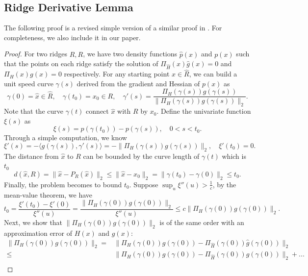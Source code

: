 \documentclass[aos,preprint]{imsart}
\theoremstyle{remark}
\begin{document}
\begin{appendix}
\section{}
\subsection{Ridge Derivative Lemma}
The following proof is a revised simple version of a similar proof in \cite{genovese2014nonparametric}. For completeness, we also include it in our paper.
\begin{proof}\label{Ridge Derivative Lemma}
 For two ridges $\hat{R}, R$, we have two density functions $\hat{p}(x)$ and $p(x)$ such that the points on each ridge satisfy the solution of
 $\Pi_{\hat{H}}(x) \hat{g}(x) = 0$ 
 and $\Pi_H(x) g(x) = 0$ respectively. For any starting point $\hat{x}\in \hat{R}$, we can build a unit speed curve $\gamma(s)$ derived from the gradient and Hessian of $p(x)$ as
 \[
 \gamma(0) = \hat{x} \in \hat{R}, \quad \gamma(t_0) = x_0 \in R, \quad \gamma'(s) = \frac{\Pi_H(\gamma(s))g(\gamma(s))}{\|\Pi_H(\gamma(s))g(\gamma(s))\|_2}.
 \]
Note that the curve $\gamma(t)$ connect $\hat{x}$ with $R$ by $x_0$. Define the univariate function $\xi(s)$ as
  \[
  \xi(s) = p(\gamma(t_0))-p(\gamma(s)), \quad 0<s<t_0.
  \]
Through a simple computation, we know 
 \[
 \xi'(s)=-\langle  g(\gamma(s)), \gamma'(s) \rangle =- \|\Pi_H(\gamma(s))g(\gamma(s))\|_2, \quad \xi'(t_0) = 0.
 \]
 The distance from $\hat{x}$ to $R$ can be bounded by the curve length of $\gamma(t)$ which is $t_0$
 \[
 d(\hat{x}, R) = \|\hat{x}-P_R(\hat{x})\|_2\leq \|\hat{x}-x_0\|_2 = \|\gamma(t_0)-\gamma(0)\|_2\leq t_0.
 \]
Finally, the problem becomes to bound $t_0$. Suppose $\sup_u \xi''(u)>\frac{1}{c}$, by the mean-value theorem, we have
 \[
 t_0 = \frac{\xi'(t_0)-\xi'(0)}{\xi''(u)} = \frac{\|\Pi_H(\gamma(0))g(\gamma(0))\|_2}{\xi''(u)} \leq c \|\Pi_H(\gamma(0))g(\gamma(0))\|_2.
 \]
 Next, we show that $\|\Pi_H(\gamma(0))g(\gamma(0))\|_2$ is of the same order with an approximation error of $H(x)$ and $g(x)$:
 \[
 \begin{aligned}
 \|\Pi_H(\gamma(0))g(\gamma(0))\|_2=&  \|\Pi_H(\gamma(0))g(\gamma(0)) - \Pi_{\hat{H}}(\gamma(0))\hat{g}(\gamma(0))\|_2\\
 \leq & \|\Pi_H(\gamma(0))g(\gamma(0)) -\Pi_{\hat{H}}(\gamma(0)){g}(\gamma(0)) \|_2 +...\\

\end{aligned}\]
\end{proof}
\end{appendix}
\end{document}
